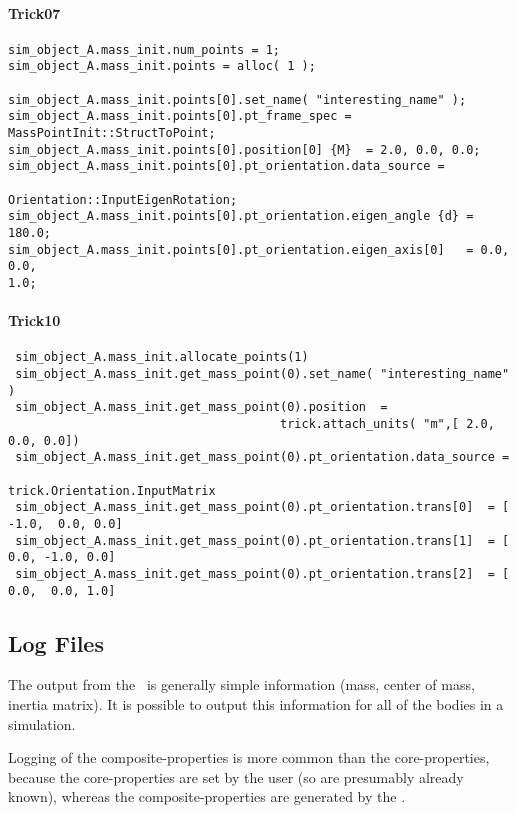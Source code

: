 \paragraph{Trick07}
\begin{verbatim}
sim_object_A.mass_init.num_points = 1;
sim_object_A.mass_init.points = alloc( 1 );

sim_object_A.mass_init.points[0].set_name( "interesting_name" );
sim_object_A.mass_init.points[0].pt_frame_spec =
MassPointInit::StructToPoint;
sim_object_A.mass_init.points[0].position[0] {M}  = 2.0, 0.0, 0.0;
sim_object_A.mass_init.points[0].pt_orientation.data_source =
                                               Orientation::InputEigenRotation;
sim_object_A.mass_init.points[0].pt_orientation.eigen_angle {d} = 180.0;
sim_object_A.mass_init.points[0].pt_orientation.eigen_axis[0]   = 0.0, 0.0,
1.0;
\end{verbatim}

\paragraph{Trick10}
\begin{verbatim}
 sim_object_A.mass_init.allocate_points(1)
 sim_object_A.mass_init.get_mass_point(0).set_name( "interesting_name" )
 sim_object_A.mass_init.get_mass_point(0).position  =
                                      trick.attach_units( "m",[ 2.0, 0.0, 0.0])
 sim_object_A.mass_init.get_mass_point(0).pt_orientation.data_source =
                                                  trick.Orientation.InputMatrix
 sim_object_A.mass_init.get_mass_point(0).pt_orientation.trans[0]  = [ -1.0,  0.0, 0.0]
 sim_object_A.mass_init.get_mass_point(0).pt_orientation.trans[1]  = [  0.0, -1.0, 0.0]
 sim_object_A.mass_init.get_mass_point(0).pt_orientation.trans[2]  = [  0.0,  0.0, 1.0]

\end{verbatim}


\subsection{Log Files}
The output from the \ModelDesc\ is generally simple information (mass, center
of
mass, inertia matrix).  It is possible to output this information for all of
the bodies in a simulation.

Logging of the composite-properties is more common than the core-properties,
because the core-properties are set by the user (so are presumably already
known), whereas the composite-properties are generated by the \ModelDesc.


